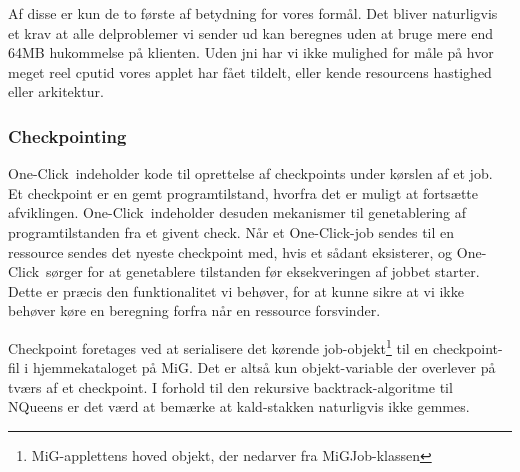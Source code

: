 \documentclass[pdf,draft,a4paper,10pt]{article}
\newcommand{\mig}{MiG}
\newcommand{\oc}{One-Click}
\begin{document}
Af disse er kun de to første af betydning for vores formål. Det bliver naturligvis et krav at alle delproblemer vi sender ud kan beregnes uden at bruge mere end 64MB hukommelse på klienten. Uden jni har vi ikke mulighed for måle på hvor meget reel cputid vores applet har fået tildelt, eller kende resourcens hastighed eller arkitektur. 
\subsubsection{Checkpointing}
\oc\ indeholder kode til oprettelse af checkpoints under kørslen af et job. Et checkpoint er en gemt programtilstand, hvorfra det er muligt at fortsætte afviklingen. \oc\ indeholder desuden mekanismer til genetablering af programtilstanden fra et givent check. Når et \oc-job sendes til en ressource sendes det nyeste checkpoint med, hvis et sådant eksisterer, og \oc\ sørger for at genetablere tilstanden før eksekveringen af jobbet starter. Dette er præcis den funktionalitet vi behøver, for at kunne sikre at vi ikke behøver køre en beregning forfra når en ressource forsvinder.    

Checkpoint foretages ved at serialisere det kørende job-objekt\footnote{\mig-applettens hoved objekt, der nedarver fra MiGJob-klassen} til en checkpoint-fil i hjemmekataloget på \mig. Det er altså kun objekt-variable der overlever på tværs af et checkpoint. I forhold til den rekursive backtrack-algoritme til NQueens er det værd at bemærke at kald-stakken naturligvis ikke gemmes.
\end{document}
